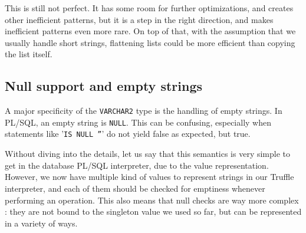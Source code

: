 \documentclass[twoside,11pt,a4paper]{article}
\newcommand{\pls}[1]{\small\texttt{#1}\normalsize}
\newcommand{\plstype}[1]{\pls{#1}}
\newcommand{\varchar}{\plstype{VARCHAR2}}
\newcommand{\plsnull}{\pls{NULL}}
\begin{document}
This is still not perfect. It has some room for further optimizations, and creates other inefficient patterns, but it is a step in the right direction, and makes inefficient patterns even more rare. On top of that, with the assumption that we usually handle short strings, flattening lists could be more efficient than copying the list itself.

\subsection{Null support and empty strings}


A major specificity of the \varchar{} type is the handling of empty strings. In PL/SQL, an empty string is \plsnull{}. This can be confusing, especially when statements like '\pls{IS NULL ''}' do not yield false as expected, but true.

Without diving into the details, let us say that this semantics is very simple to get in the database PL/SQL interpreter, due to the value representation. However, we now have multiple kind of values to represent strings in our Truffle interpreter, and each of them should be checked for emptiness whenever performing an operation. This also means that null checks are way more complex : they are not bound to the singleton value we used so far, but can be represented in a variety of ways.
\end{document}
